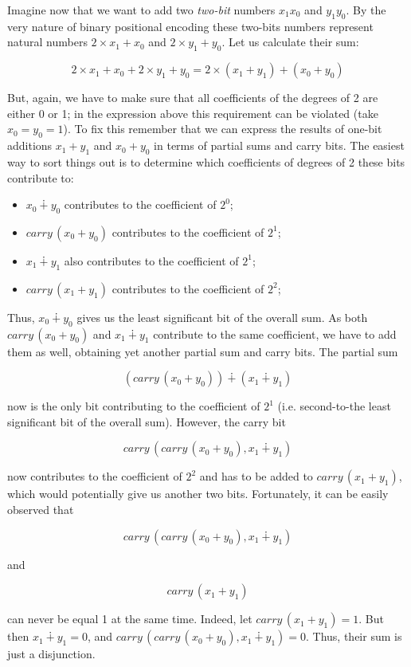 Imagine now that we want to add two \emph{two-bit} numbers $x_1x_0$ and $y_1y_0$. By the very nature of
binary positional encoding these two-bits numbers represent natural numbers $2\times x_1+x_0$ and
$2\times y_1+y_0$. Let us calculate their sum:

\[
2\times x_1 + x_0 + 2\times y_1+y_0 = 2\times (x_1+y_1) + (x_0+y_0)
\]

But, again, we have to make sure that all coefficients of the degrees of 2 are either 0 or 1; in the
expression above this requirement can be violated (take $x_0=y_0=1$). To fix this remember that we
can express the results of one-bit additions $x_1+y_1$ and $x_0+y_0$ in terms of partial sums and carry bits.
The easiest way to sort things out is to determine which coefficients of degrees of 2 these bits
contribute to:

\begin{itemize}
\item $x_0\dotplus y_0$ contributes to the coefficient of $2^0$;
\item $carry\,(x_0+y_0)$ contributes to the coefficient of $2^1$;
\item $x_1\dotplus y_1$ also contributes to the coefficient of $2^1$;
\item $carry\,(x_1+ y_1)$ contributes to the coefficient of $2^2$;
\end{itemize}

Thus, $x_0\dotplus y_0$ gives us the least significant bit of the overall sum. As both $carry\,(x_0+y_0)$ and 
$x_1\dotplus y_1$ contribute to the same coefficient, we have to add them as well, obtaining yet another
partial sum and carry bits. The partial sum

\[
(carry\,(x_0+y_0))\dotplus(x_1\dotplus y_1)
\]

now is the only bit contributing to the coefficient of $2^1$ (i.e. second-to-the least significant bit of the
overall sum). However, the carry bit

\[
carry\,(carry\,(x_0+y_0), x_1\dotplus y_1)
\]

now contributes to the coefficient of $2^2$ and has to be added to $carry\,(x_1+ y_1)$, which would potentially
give us another two bits. Fortunately, it can be easily observed that

\[
carry\,(carry\,(x_0+y_0), x_1\dotplus y_1)
\]

and

\[
carry\,(x_1+y_1)
\]

can never be equal 1 at the same time. Indeed, let $carry\,(x_1+y_1)=1$. But then $x_1\dotplus y_1=0$, and
$carry\,(carry\,(x_0+y_0), x_1\dotplus y_1)=0$. Thus, their sum is just a disjunction.

